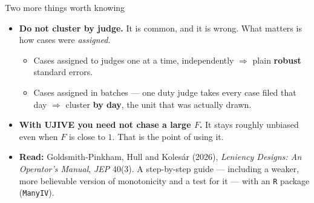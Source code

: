 \documentclass[
  11pt,
  ignorenonframetext,
  aspectratio=169,
]{beamer}
\providecommand{\tightlist}{%
  \setlength{\itemsep}{0pt}\setlength{\parskip}{0pt}}
\begin{document}
\begin{frame}{Two more things worth knowing}
\protect{}\label{two-more-things-worth-knowing}
\begin{itemize}
\tightlist
\item
  \textbf{Do not cluster by judge.} It is common, and it is wrong. What
  matters is how cases were \emph{assigned}.

  \begin{itemize}
  \tightlist
  \item
    Cases assigned to judges one at a time, independently
    \(\Rightarrow\) plain \textbf{robust} standard errors.
  \item
    Cases assigned in batches --- one duty judge takes every case filed
    that day \(\Rightarrow\) cluster \textbf{by day}, the unit that was
    actually drawn.
  \end{itemize}
\item
  \textbf{With UJIVE you need not chase a large \(F\).} It stays roughly
  unbiased even when \(F\) is close to \(1\). That is the point of using
  it.
\end{itemize}

\vspace{0.4em}

\begin{itemize}
\tightlist
\item
  \textbf{Read:} Goldsmith-Pinkham, Hull and Kolesár (2026),
  \emph{Leniency Designs: An Operator's Manual}, \emph{JEP} 40(3). A
  step-by-step guide --- including a weaker, more believable version of
  monotonicity and a test for it --- with an \texttt{R} package
  (\texttt{ManyIV}).
\end{itemize}
\end{frame}
\end{document}
